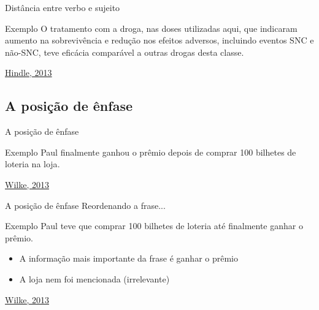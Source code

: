 \documentclass{beamer}
\begin{document}
\begin{frame}{Distância entre verbo e sujeito}
  \begin{exampleblock}{Exemplo}
    \scriptsize
    O \alert{tratamento com a droga}, nas doses utilizadas aqui, que
    indicaram aumento na sobrevivência e redução nos efeitos adversos,
    incluindo eventos SNC e não-SNC, \alert{teve} eficácia
    comparável a outras drogas desta classe.
  \end{exampleblock}

  \vfill
  \scriptsize
  \hfill \href{https://web.archive.org/web/20150512001938/http://www.edanzediting.com/blog/reader_expectations_subject_verb_placement}
  {Hindle, 2013}
\end{frame}

\subsection{A posição de ênfase}

\begin{frame}{A posição de ênfase}
  \begin{exampleblock}{Exemplo}
    \footnotesize
    Paul finalmente ganhou o prêmio depois de comprar 100 bilhetes de
    loteria \alert<2->{na loja}.
  \end{exampleblock}


  \vfill
  \scriptsize
  \hfill \href{http://serialmentor.com/blog/2013/9/26/writing-paragraphs-that-make-sensethe-topic-and-the-stress-position}
  {Wilke, 2013}
\end{frame}

\begin{frame}{A posição de ênfase}
  Reordenando a frase...
  \begin{exampleblock}{Exemplo}
    \footnotesize
      Paul teve que comprar 100 bilhetes de loteria até finalmente
      \alert<2->{ganhar o prêmio}.
  \end{exampleblock}
  \begin{itemize}
    \footnotesize
  \item A informação mais importante da frase é \alert{ganhar o
      prêmio}
  \item A loja nem foi mencionada (irrelevante)
  \end{itemize}


  \vfill
  \scriptsize
  \hfill \href{http://serialmentor.com/blog/2013/9/26/writing-paragraphs-that-make-sensethe-topic-and-the-stress-position}
  {Wilke, 2013}
\end{frame}
\end{document}
